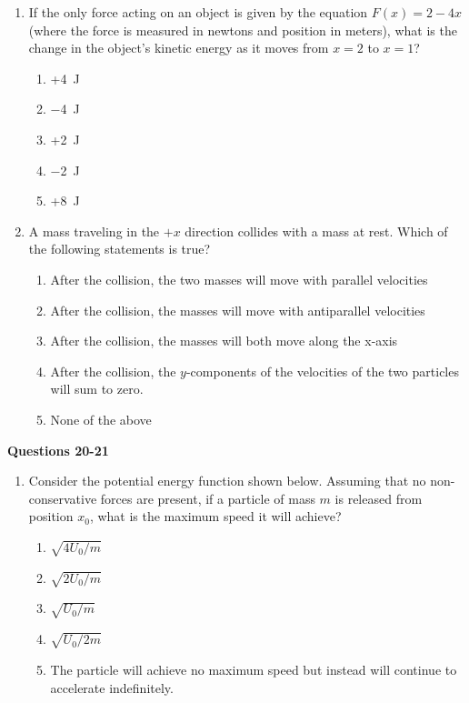 \documentclass{../../oss-apphys}
\begin{document}
\begin{multicols}{2}
\begin{enumerate}[resume,leftmargin=18pt]
  \item If the only force acting on an object is given by the equation
    $F(x)=2-4x$ (where the force is measured in newtons and position in meters),
    what is the change in the object's kinetic energy as it moves from $x=2$ to
    $x=1$?
    \begin{enumerate}[noitemsep,topsep=0pt,leftmargin=18pt,label=(\Alph*)]
    \item +\SI{4}{\joule}
    \item \SI{-4}{\joule}
    \item +\SI{2}{\joule}
    \item \SI{-2}{\joule}
    \item +\SI{8}{\joule}
    \end{enumerate}

  \item A mass traveling in the $+x$ direction collides with a mass at rest.
    Which of the following statements is true?
    \begin{enumerate}[noitemsep,topsep=0pt,leftmargin=18pt,label=(\Alph*)]
    \item After the collision, the two masses will move with parallel velocities
    \item After the collision, the masses will move with antiparallel velocities
    \item After the collision, the masses will both move along the x-axis
    \item After the collision, the $y$-components of the velocities of the two
      particles will sum to zero.
    \item None of the above
    \end{enumerate}
  \end{enumerate}
  \columnbreak
  
  \textbf{Questions 20-21}

  \begin{enumerate}[resume,leftmargin=18pt]
  \item Consider the potential energy function shown below. Assuming that no
    non-conservative forces are present, if a particle of mass $m$ is released
    from position $x_0$, what is the maximum speed it will achieve?
    \begin{center}
    \end{center}
    \begin{enumerate}[noitemsep,topsep=0pt,leftmargin=18pt,label=(\Alph*)]
    \item $\sqrt{4U_0/m}$
    \item $\sqrt{2U_0/m}$
    \item $\sqrt{U_0/m}$
    \item $\sqrt{U_0/2m}$
    \item The particle will achieve no maximum speed but instead will continue
      to accelerate indefinitely.
    \end{enumerate}


\end{enumerate}
\end{multicols}
\end{document}
